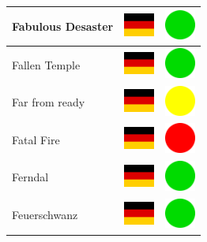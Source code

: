 \documentclass[12pt, a4paper, twoside]{report}
\begin{document}
\begin{center}
\begin{longtable}{|p{5cm}|p{2cm}|p{2cm}|}
 Fabulous Desaster                                          & \includegraphics[width=1cm]{4x3/de} &   \includegraphics[width=1cm]{likes/y} \\ \hline
 Fallen Temple                                              & \includegraphics[width=1cm]{4x3/de} &   \includegraphics[width=1cm]{likes/y} \\ \hline
 Far from ready                                             & \includegraphics[width=1cm]{4x3/de} &   \includegraphics[width=1cm]{likes/m} \\ \hline
 Fatal Fire                                                 & \includegraphics[width=1cm]{4x3/de} &   \includegraphics[width=1cm]{likes/n} \\ \hline
 Ferndal                                                    & \includegraphics[width=1cm]{4x3/de} &   \includegraphics[width=1cm]{likes/y} \\ \hline
 Feuerschwanz                                               & \includegraphics[width=1cm]{4x3/de} &   \includegraphics[width=1cm]{likes/y} \\ \hline

\end{longtable}
\end{center}
\end{document}
